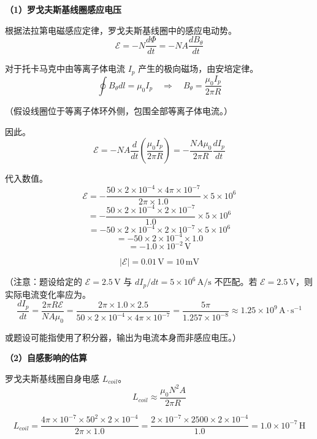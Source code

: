 \textbf{（1）罗戈夫斯基线圈感应电压}

根据法拉第电磁感应定律，罗戈夫斯基线圈中的感应电动势。
\begin{equation}
    \mathcal{E} = -N \frac{d\Phi}{dt} = -N A \frac{dB_{\theta}}{dt}
\label{eq:ch12-faraday-law}
\end{equation}

对于托卡马克中由等离子体电流 $I_p$ 产生的极向磁场，由安培定律。
\begin{equation}
    \oint B_{\theta} dl = \mu_0 I_p \quad\Rightarrow\quad B_{\theta} = \frac{\mu_0 I_p}{2\pi R}
\label{eq:ch12-ampere-law}
\end{equation}

（假设线圈位于等离子体环外侧，包围全部等离子体电流。）

因此。
\begin{equation}
    \mathcal{E} = -N A \frac{d}{dt}\left(\frac{\mu_0 I_p}{2\pi R}\right) = -\frac{N A \mu_0}{2\pi R} \frac{dI_p}{dt}
\label{eq:ch12-rogowski-emf}
\end{equation}

代入数值。
\[
    \mathcal{E} = -\frac{50 \times 2\times10^{-4} \times 4\pi\times10^{-7}}{2\pi \times 1.0} \times 5\times10^6
\]
\[
    = -\frac{50 \times 2\times10^{-4} \times 2\times10^{-7}}{1.0} \times 5\times10^6
\]
\[
    = -50 \times 2\times10^{-4} \times 2\times10^{-7} \times 5\times10^6
\]
\[
    = -50 \times 2\times10^{-4} \times 1.0
\]
\[
    = -1.0\times10^{-2}\,\mathrm{V}
\]

\[
    \boxed{|\mathcal{E}| = 0.01\,\mathrm{V} = 10\,\mathrm{mV}}
\]

（注意：题设给定的 $\mathcal{E}=2.5\,\mathrm{V}$ 与 $dI_p/dt=5\times10^6\,\mathrm{A/s}$ 不匹配。若 $\mathcal{E}=2.5\,\mathrm{V}$，则实际电流变化率应为。
\[
    \frac{dI_p}{dt} = \frac{2\pi R \mathcal{E}}{N A \mu_0} = \frac{2\pi \times 1.0 \times 2.5}{50 \times 2\times10^{-4} \times 4\pi\times10^{-7}} = \frac{5\pi}{1.257\times10^{-8}} \approx 1.25\times10^9\,\mathrm{A\cdot s^{-1}}
\]

或题设可能指使用了积分器，输出为电流本身而非感应电压。）

\textbf{（2）自感影响的估算}

罗戈夫斯基线圈自身电感 $L_{coil}$。
\[
    L_{coil} \approx \frac{\mu_0 N^2 A}{2\pi R}
\]

\[
    L_{coil} = \frac{4\pi\times10^{-7} \times 50^2 \times 2\times10^{-4}}{2\pi \times 1.0}
    = \frac{2\times10^{-7}\times2500\times2\times10^{-4}}{1.0}
    = 1.0\times10^{-7}\,\mathrm{H}
\]

